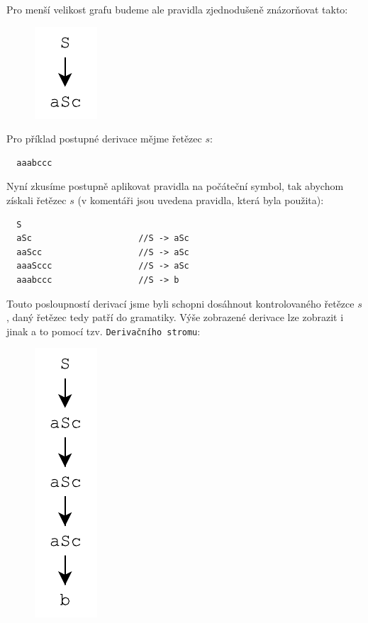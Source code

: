 \noindent
Pro menší velikost grafu budeme ale pravidla zjednodušeně znázorňovat takto:

\begin{figure}[H]
  \centering
  \includegraphics{fig/RuleTree2.pdf}
\end{figure}

\noindent
Pro příklad postupné derivace mějme řetězec $s$:

\begin{lstlisting}
  aaabccc
\end{lstlisting}

\noindent
Nyní zkusíme postupně aplikovat pravidla na počáteční symbol,
tak abychom získali řetězec $s$
(v komentáři jsou uvedena pravidla, která byla použita):

\begin{lstlisting}
  S
  aSc                     //S -> aSc
  aaScc                   //S -> aSc
  aaaSccc                 //S -> aSc
  aaabccc                 //S -> b
\end{lstlisting}

\noindent
Touto posloupností derivací jsme byli schopni dosáhnout kontrolovaného řetězce $s$,
daný řetězec tedy patří do gramatiky. Výše zobrazené derivace lze zobrazit
i jinak a to pomocí tzv. \texttt{Derivačního stromu}:

\begin{figure}[H]
  \centering
  \includegraphics{fig/Derivations1.pdf}
\end{figure}

